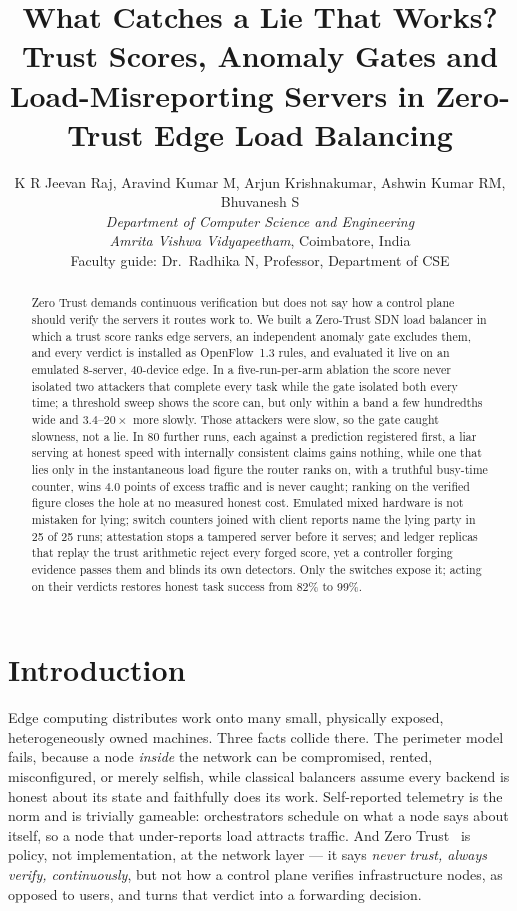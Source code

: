 \documentclass[10pt,twocolumn,letterpaper]{article}
\title{What Catches a Lie That Works? Trust Scores, Anomaly Gates and\\
       Load-Misreporting Servers in Zero-Trust Edge Load Balancing}
\author{%
  K R Jeevan Raj, \quad Aravind Kumar M, \quad Arjun Krishnakumar, \quad
  Ashwin Kumar RM, \quad Bhuvanesh S\\[2pt]
  \textit{Department of Computer Science and Engineering}\\
  \textit{Amrita Vishwa Vidyapeetham}, Coimbatore, India\\[2pt]
  {\small Faculty guide: Dr.\ Radhika N, Professor, Department of CSE}
}
\date{}
\begin{document}
\maketitle

\begin{abstract}
Zero Trust demands continuous verification but does not say how a
control plane should verify the servers it routes work to. We built a
Zero-Trust SDN load balancer in which a trust score ranks edge servers, an
independent anomaly gate excludes them, and every verdict is installed as
OpenFlow~1.3 rules, and evaluated it live on an emulated 8-server, 40-device
edge. In a five-run-per-arm ablation the score never isolated two attackers
that complete every task while the gate isolated both every time; a threshold
sweep shows the score can, but only within a band a few hundredths wide and
$3.4$--$20\times$ more slowly. Those attackers were slow, so the gate caught
slowness, not a lie. In 80 further runs, each against a prediction
registered first, a liar serving at honest speed with internally consistent
claims gains nothing, while one that lies only in the instantaneous load
figure the router ranks on, with a truthful busy-time counter, wins $4.0$
points of excess traffic and is never caught; ranking on the
verified figure closes the hole at no measured honest cost. Emulated mixed
hardware is not mistaken for lying; switch counters joined with client reports
name the lying party in 25 of 25 runs; attestation stops a tampered server
before it serves; and ledger replicas that replay the trust arithmetic reject
every forged score, yet a controller forging evidence passes them and blinds
its own detectors. Only the switches expose it; acting on their verdicts restores
honest task success from 82\% to 99\%.
\end{abstract}


\section{Introduction}

Edge computing distributes work onto many small, physically exposed,
heterogeneously owned machines. Three facts collide there. The perimeter model
fails, because a node \emph{inside} the network can be compromised, rented,
misconfigured, or merely selfish, while classical balancers assume every
backend is honest about its state and faithfully does its work. Self-reported
telemetry is the norm and is trivially gameable: orchestrators schedule on what
a node says about itself, so a node that under-reports load attracts traffic.
And Zero Trust~\cite{rose2020zta} is policy, not implementation, at the network
layer --- it says \emph{never trust, always verify, continuously}, but not how
a control plane verifies infrastructure nodes, as opposed to users, and turns
that verdict into a forwarding decision.
\end{document}
